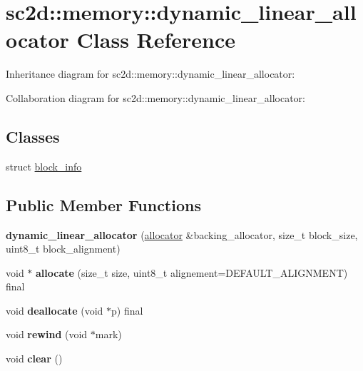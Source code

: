 \hypertarget{classsc2d_1_1memory_1_1dynamic__linear__allocator}{}\section{sc2d\+:\+:memory\+:\+:dynamic\+\_\+linear\+\_\+allocator Class Reference}
\label{classsc2d_1_1memory_1_1dynamic__linear__allocator}


Inheritance diagram for sc2d\+:\+:memory\+:\+:dynamic\+\_\+linear\+\_\+allocator\+:


Collaboration diagram for sc2d\+:\+:memory\+:\+:dynamic\+\_\+linear\+\_\+allocator\+:
\subsection*{Classes}
\begin{DoxyCompactItemize}
\item 
struct \hyperlink{structsc2d_1_1memory_1_1dynamic__linear__allocator_1_1block__info}{block\+\_\+info}
\end{DoxyCompactItemize}
\subsection*{Public Member Functions}
\begin{DoxyCompactItemize}
\item 
\mbox{\label{classsc2d_1_1memory_1_1dynamic__linear__allocator_a322098fc32440b93c20d5af08fba5c53}} 
{\bfseries dynamic\+\_\+linear\+\_\+allocator} (\hyperlink{classsc2d_1_1memory_1_1allocator}{allocator} \&backing\+\_\+allocator, size\+\_\+t block\+\_\+size, uint8\+\_\+t block\+\_\+alignment)
\item 
\mbox{\label{classsc2d_1_1memory_1_1dynamic__linear__allocator_ae73891afb686e35f8a8c4856225801d3}} 
void $\ast$ {\bfseries allocate} (size\+\_\+t size, uint8\+\_\+t alignement=D\+E\+F\+A\+U\+L\+T\+\_\+\+A\+L\+I\+G\+N\+M\+E\+NT) final
\item 
\mbox{\label{classsc2d_1_1memory_1_1dynamic__linear__allocator_a5c86c1de6759df60dcf5c3fe1a77f047}} 
void {\bfseries deallocate} (void $\ast$p) final
\item 
\mbox{\label{classsc2d_1_1memory_1_1dynamic__linear__allocator_ab692d139c235af03cbb49513e62ec6ec}} 
void {\bfseries rewind} (void $\ast$mark)
\item 
\mbox{\label{classsc2d_1_1memory_1_1dynamic__linear__allocator_a8194c1e4e1d2d5cbcf4d198d872e9a0a}} 
void {\bfseries clear} ()
\end{DoxyCompactItemize}

